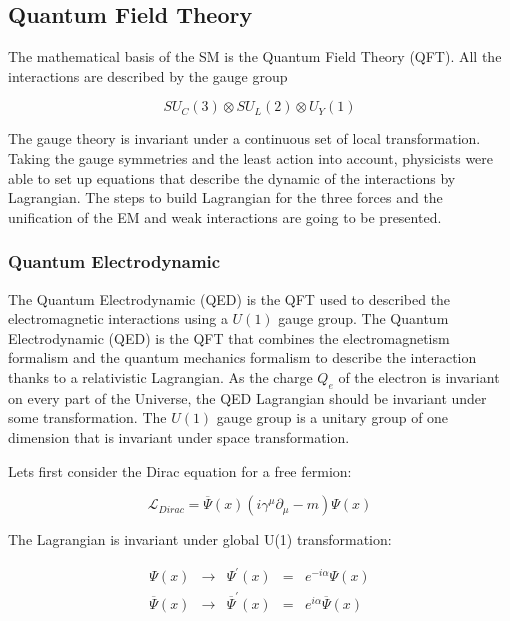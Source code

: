     \subsection{Quantum Field Theory}

	The mathematical basis of the SM is the Quantum Field Theory (QFT). All the interactions are described by the gauge group 
    
      \begin{equation}
    	SU_C(3) \otimes SU_L(2) \otimes U_Y(1)
	  \end{equation}
    
    The gauge theory is invariant under a continuous set of local transformation.
    Taking the gauge symmetries and the least action into account, physicists were able to set up equations that describe the dynamic of the interactions by Lagrangian.
    The steps to build Lagrangian for the three forces and the unification of the EM and weak interactions are going to be presented. 
    
      \subsubsection{Quantum Electrodynamic}

      The Quantum Electrodynamic (QED) is the QFT used to described the electromagnetic interactions using a $U(1)$ gauge group.
     The Quantum Electrodynamic (QED) is the QFT that combines the electromagnetism formalism and the quantum mechanics formalism to describe the interaction thanks to a relativistic Lagrangian.
     As the charge $Q_e$ of the electron is invariant on every part of the Universe, the QED Lagrangian should be invariant under some transformation.
     The $U(1)$ gauge group is a unitary group of one dimension that is invariant under space transformation.

      Lets first consider the Dirac equation for a free fermion:
      
      \begin{equation}
        \mathcal{L}_{Dirac} = \overline{\Psi}\left(x\right) \left(i \gamma^{\mu}\partial_{\mu} - m \right) \Psi\left(x\right)
      \end{equation}

      The Lagrangian is invariant under global U(1) transformation:

      \begin{equation}
            \begin{array}{rrccr}
             \Psi \left(x \right) & \rightarrow & \Psi^{'} \left(x \right)  & = & e^{-i\alpha} \Psi\left(x\right) \\
             \overline{\Psi}\left(x\right) & \rightarrow & \overline{\Psi}^{'}\left(x\right) & = & e^{i\alpha}  \overline{\Psi}\left(x\right) \\
            \end{array}
      \end{equation}

